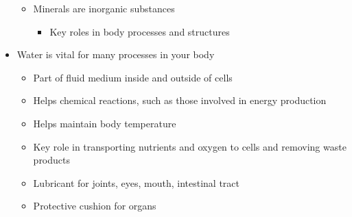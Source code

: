 \documentclass[12pt]{article}
\begin{document}
\begin{itemize}
\begin{itemize}
                        \item Minerals are inorganic substances
                            \begin{itemize}
                                \item Key roles in body processes and structures
                            \end{itemize}
                    \end{itemize}
                \item Water is vital for many processes in your body
                    \begin{itemize}
                        \item Part of fluid medium inside and outside of cells
                        \item Helps chemical reactions, such as those involved in energy production
                        \item Helps maintain body temperature
                        \item Key role in transporting nutrients and oxygen to cells and removing waste products
                        \item Lubricant for joints, eyes, mouth, intestinal tract
                        \item Protective cushion for organs
                    \end{itemize}
            \end{itemize}
\end{document}
